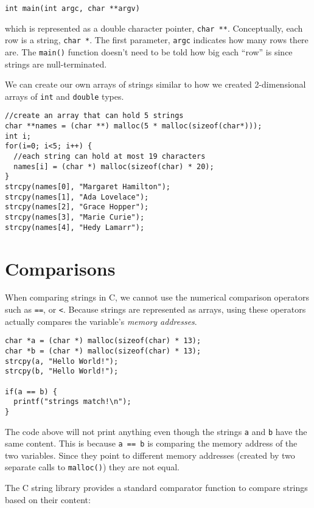 \texttt{int main(int argc, char **argv)}

which is represented as a double character pointer, 
\texttt{char **}.  Conceptually, each row is
a string, \texttt{char *}.  The first parameter,
\texttt{argc} indicates how many rows there are.
The \texttt{main()} function doesn't need to
be told how big each ``row'' is since strings are 
null-terminated.

We can create our own arrays of strings similar to
how we created 2-dimensional arrays of \texttt{int}
and \texttt{double} types.

\begin{verbatim}
//create an array that can hold 5 strings
char **names = (char **) malloc(5 * malloc(sizeof(char*)));
int i;
for(i=0; i<5; i++) {
  //each string can hold at most 19 characters
  names[i] = (char *) malloc(sizeof(char) * 20);
}
strcpy(names[0], "Margaret Hamilton");
strcpy(names[1], "Ada Lovelace");
strcpy(names[2], "Grace Hopper");
strcpy(names[3], "Marie Curie");
strcpy(names[4], "Hedy Lamarr");
\end{verbatim}

\section{Comparisons}

When comparing strings in C, we cannot use the numerical
comparison operators such as \texttt{==}, or
\texttt{<}.  Because strings are represented as
arrays, using these operators actually compares the
variable's \emph{memory addresses}.

\begin{verbatim}
char *a = (char *) malloc(sizeof(char) * 13);
char *b = (char *) malloc(sizeof(char) * 13);
strcpy(a, "Hello World!");
strcpy(b, "Hello World!");

if(a == b) {
  printf("strings match!\n");
}
\end{verbatim}

The code above will not print anything even though
the strings \texttt{a} and \texttt{b}
have the same content.  This is because \texttt{a == b}
is comparing the memory address of the two variables.
Since they point to different memory addresses 
(created by two separate calls to \texttt{malloc()})
they are not equal.

The C string library provides a standard \gls{comparator}
function to compare strings based on their content:


